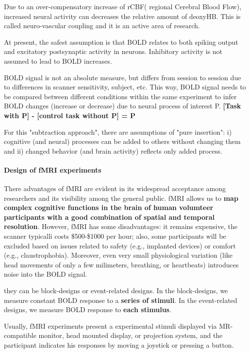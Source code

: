 \documentclass[12pt,article,oneside,a4paper]{memoir}
\begin{document}
Due to an over-compensatory increase of rCBF( regional Cerebral Blood Flow), increased neural activity can decreases the relative amount of deoxyHB. This is called neuro-vascular coupling and it is an active area of research.

At present, the safest assumption is that BOLD relates to both spiking output and excitatory postsynaptic activity in neurons. Inhibitory activity is not assumed to lead to BOLD increases.

BOLD signal is not an absolute measure, but differs from session to session due to differences in scanner sensitivity, subject, etc. This way, BOLD signal needs to be compared between different conditions within the same experiment to infer BOLD changes (increase or decrease) due to neural process of interest P. \textbf{[Task with P] - [control task without P] = P}

For this "subtraction approach", there are assumptions of "pure insertion": i) cognitive (and neural) processes can be added to others without changing them and ii) changed behavior (and brain activity) reflects only added process.

\paragraph{Design of fMRI experiments} There advantages of fMRI are evident in its widespread acceptance among researchers and its visibility among the general public. fMRI allows us to \textbf{map complex cognitive functions in the brain of human volumteer participants with a good combination of spatial and temporal resolution}. However, fMRI has some disadvantages: it remains expensive, the scanner typicalli costs \$500-\$1000 per hour; also, some participants will be excluded based on issues related to safety (e.g., implanted devices) or comfort (e.g., claustrophobia). Moreover, even very small physiological variation (like head movements of only a few milimeters, breathing, or heartbeats) introduces noise into the BOLD signal.

they can be block-designs or event-related designs. In the block-designs, we measure constant BOLD response to a \textbf{series of stimuli}. In the event-related designs, we measure BOLD response to \textbf{each stimulus}.

Usually, fMRI experiments present a experimental stimuli displayed via MR-compatible monitor, head mounted display, or projection system, and the participant indicates his responses by moving a joystick or pressing a button.
\end{document}
